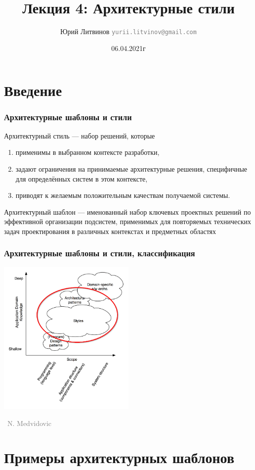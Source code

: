 \documentclass[xetex,mathserif,serif]{beamer}
\title{Лекция 4: Архитектурные стили}
\author[Юрий Литвинов]{Юрий Литвинов \newline \textcolor{gray}{\small\texttt{yurii.litvinov@gmail.com}}}
\date{06.04.2021г}
\newcommand{\attribution}[1] {
    \vspace{-5mm}\begin{flushright}\begin{scriptsize}\textcolor{gray}{\textcopyright\, #1}\end{scriptsize}\end{flushright}
}
\begin{document}
    
    \frame{\titlepage}

    \section{Введение}

    \begin{frame}
        \frametitle{Архитектурные шаблоны и стили}
        Архитектурный стиль --- набор решений, которые
        \begin{enumerate}
            \item применимы в выбранном контексте разработки,
            \item задают ограничения на принимаемые архитектурные решения, специфичные для определённых систем в этом контексте,
            \item приводят к желаемым положительным качествам получаемой системы.
        \end{enumerate}
        Архитектурный шаблон --- именованный набор ключевых проектных решений по эффективной организации подсистем, применимых для повторяемых технических задач проектирования в различных контекстах и предметных областях
    \end{frame}

    \begin{frame}
        \frametitle{Архитектурные шаблоны и стили, классификация}
        \begin{center}
            \includegraphics[width=0.5\textwidth]{architecturalStylesHighlighted.png}
            \attribution{N. Medvidovic}
        \end{center}
    \end{frame}

    \section{Примеры архитектурных шаблонов}
\end{document}
